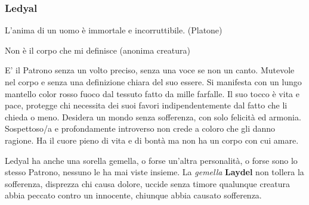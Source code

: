 \begin{multicols}{2}
\subsubsection{Ledyal}\label{ledyal}\label{laydel}\hypertarget{ledyal}{} \hypertarget{laydel}{}

\begin{changemargin}{0.3cm}{0.3cm}\begin{enfasi}{
L'anima di un uomo è immortale e incorruttibile. (Platone)

\medskip

Non è il corpo che mi definisce (anonima creatura)
}\end{enfasi}\end{changemargin}\medskip

E' il Patrono senza un volto preciso, senza una voce se non un canto. Mutevole nel corpo e senza una definizione chiara del suo essere. Si manifesta con un lungo mantello color rosso fuoco dal tessuto fatto da mille farfalle. Il suo tocco è vita e pace, protegge chi necessita dei suoi favori indipendentemente dal fatto che li chieda o meno. Desidera un mondo senza sofferenza, con solo felicità ed armonia. Sospettoso/a e profondamente introverso non crede a coloro che gli danno ragione. Ha il cuore pieno di vita e di bontà ma non ha un corpo con cui amare.

Ledyal ha anche una sorella gemella, o forse un'altra personalità, o forse sono lo stesso Patrono, nessuno le ha mai viste insieme. La \emph{gemella} \textbf{Laydel} non tollera la sofferenza, disprezza chi causa dolore, uccide senza timore qualunque creatura abbia peccato contro un innocente, chiunque abbia causato sofferenza.


\end{multicols}
